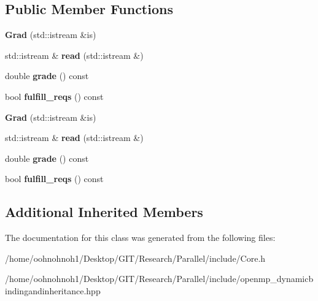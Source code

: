 \subsection*{Public Member Functions}
\begin{DoxyCompactItemize}
\item 
\mbox{\label{classGrad_a683d203e0526d3926007681b7af7b0e5}} 
{\bfseries Grad} (std\+::istream \&is)
\item 
\mbox{\label{classGrad_a1ebec71605902156aa973a55e432d1d9}} 
std\+::istream \& {\bfseries read} (std\+::istream \&)
\item 
\mbox{\label{classGrad_aa481be2e8f7e4c16942221cd4931b431}} 
double {\bfseries grade} () const
\item 
\mbox{\label{classGrad_ae2bae0e60fbce15836f55a90d0fc2c0e}} 
bool {\bfseries fulfill\+\_\+reqs} () const
\item 
\mbox{\label{classGrad_a683d203e0526d3926007681b7af7b0e5}} 
{\bfseries Grad} (std\+::istream \&is)
\item 
\mbox{\label{classGrad_a1ebec71605902156aa973a55e432d1d9}} 
std\+::istream \& {\bfseries read} (std\+::istream \&)
\item 
\mbox{\label{classGrad_aa481be2e8f7e4c16942221cd4931b431}} 
double {\bfseries grade} () const
\item 
\mbox{\label{classGrad_ae2bae0e60fbce15836f55a90d0fc2c0e}} 
bool {\bfseries fulfill\+\_\+reqs} () const
\end{DoxyCompactItemize}
\subsection*{Additional Inherited Members}


The documentation for this class was generated from the following files\+:\begin{DoxyCompactItemize}
\item 
/home/oohnohnoh1/\+Desktop/\+G\+I\+T/\+Research/\+Parallel/include/Core.\+h\item 
/home/oohnohnoh1/\+Desktop/\+G\+I\+T/\+Research/\+Parallel/include/openmp\+\_\+dynamicbindingandinheritance.\+hpp\end{DoxyCompactItemize}
